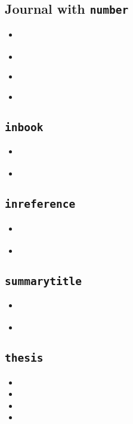 \documentclass[a4paper,12pt]{scrartcl}
\newcommand*{\Typ}[1]{\texttt{\symbol{64}#1}}
\newcommand*{\Feld}[1]{\texttt{#1}}
\begin{document}
\subsection{Journal with \Feld{number}}
\begin{itemize}
    \item\cite{arora:becker:1997}%
    \item{}%
	\item\cite{asmus:1938}%
    \item{}%
\end{itemize}

\subsection{\Typ{inbook}}
\begin{itemize}
    \item\cites{boppert:1998}%
    \item{}%
\end{itemize}


\subsection{\Typ{inreference}}
\begin{itemize}
    \item\cite{bauchhenss:et:al:1978}%
    \item{}%
\end{itemize}

\subsection{\Feld{summarytitle}}
\begin{itemize}
    \item\cite{ilinskaja:1965}%
    \item{}%
\end{itemize}

\subsection{\Typ{thesis}}
\begin{itemize}
    \item{}%
    \item{}%
    \item{}%
    \item{}%
\end{itemize}
\end{document}
